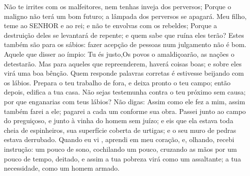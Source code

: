 {Não te irrites com os malfeitores, nem tenhas inveja dos perversos;
Porque o maligno não terá um bom futuro; a lâmpada dos perversos se apagará.
Meu filho, teme ao SENHOR e ao rei; e não te envolvas com os rebeldes;
Porque a destruição deles se levantará de repente; e quem sabe que ruína eles terão?
Estes
{} também são para os sábios: fazer acepção de pessoas num julgamento não é bom.
Aquele que disser ao ímpio: Tu és justo,Os povos o amaldiçoarão, as nações o detestarão.
Mas para aqueles que
{} repreenderem, haverá coisas boas; e sobre eles virá uma boa bênção.
Quem responde palavras corretas é
{} estivesse beijando com os lábios.
Prepara o teu trabalho de fora, e deixa pronto o teu campo; então depois, edifica a tua casa.
Não sejas testemunha contra o teu próximo sem causa; por que enganarias com teus lábios?
Não digas: Assim como ele fez a mim, assim também farei a ele; pagarei a cada um conforme sua obra.
Passei junto ao campo do preguiçoso, e junto à vinha do homem sem juízo;
e eis que ela estava toda cheia de espinheiros,
{} sua superfície coberta de urtigas; e o seu muro de pedras estava derrubado.
Quando eu vi
{} , aprendi em meu coração, e, olhando, recebi instrução:
um pouco de sono, cochilando um pouco, cruzando as mãos por um pouco de tempo, deitado,
e assim a tua pobreza virá como um assaltante; a tua necessidade, como um homem armado.

}
